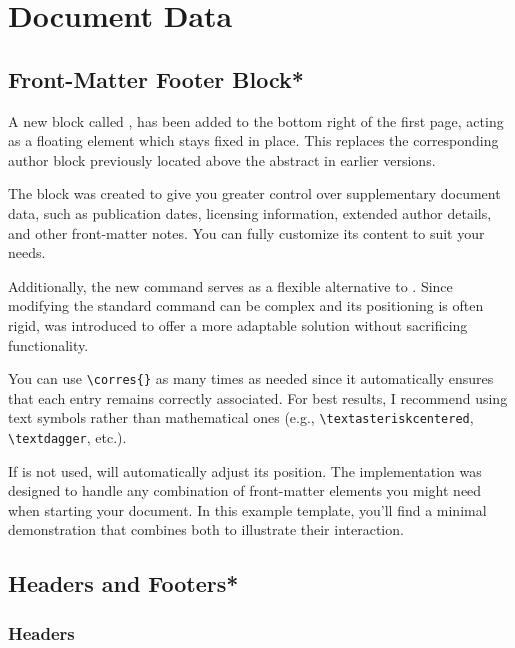 \documentclass[9pt,a4paper,twocolumn,twoside]{rho-class/rho}
\begin{document}
\section{Document Data}

    \subsection{Front-Matter Footer Block*}

        A new block called \inlinecode{\docinfo{}}, has been added to the bottom right of the first page, acting as a floating element which stays fixed in place. This replaces the corresponding author block previously located above the abstract in earlier versions.

        The \inlinecode{\docinfo{}} block was created to give you greater control over supplementary document data, such as publication dates, licensing information, extended author details, and other front-matter notes. You can fully customize its content to suit your needs.

        Additionally, the new \inlinecode{\corres{}} command serves as a flexible alternative to \inlinecode{\thanks{}}. Since modifying the standard \inlinecode{\thanks{}} command can be complex and its positioning is often rigid, \inlinecode{\corres{}} was introduced to offer a more adaptable solution without sacrificing functionality. 
        
        \begin{note}
            You can use \verb|\corres{}| as many times as needed since it automatically ensures that each entry remains correctly associated. For best results, I recommend using text symbols rather than mathematical ones (e.g., \verb|\textasteriskcentered|, \verb|\textdagger|, etc.). 
        \end{note}

        If \inlinecode{\corres{}} is not used, \inlinecode{\docinfo{}} will automatically adjust its position. The implementation was designed to handle any combination of front-matter elements you might need when starting your document. In this example template, you’ll find a minimal demonstration that combines both to illustrate their interaction.

    \subsection{Headers and Footers*}

        \subsubsection{Headers}
\end{document}
